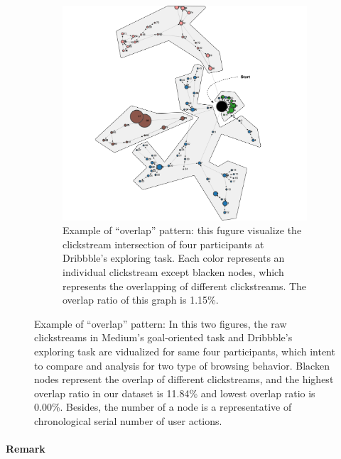 \begin{figure}[H]
    \begin{subfigure}[b]{0.60\textwidth}
        \includegraphics[width=1\textwidth]{figures/overlap2}
        \caption{Example of ``overlap'' pattern: this fugure visualize the clickstream intersection
        of four participants at Dribbble's exploring task. Each color represents an
        individual clickstream except blacken nodes, which represents the overlapping of different clickstreams.
        The overlap ratio of this graph is 1.15\%.}
        \label{fig:overlap-example-1}
    \end{subfigure}

    \caption{Example of ``overlap'' pattern: In this two figures, the raw clickstreams in
    Medium's goal-oriented task and Dribbble's exploring task are vidualized
    for same four participants, which intent to compare and analysis for two type of browsing behavior.
    Blacken nodes represent the overlap of different clickstreams, and the highest overlap ratio
    in our dataset is 11.84\% and lowest overlap ratio is 0.00\%. Besides, the number of a node
    is a representative of chronological serial number of user actions.
    }
    \label{fig:overlap-examples}
\end{figure}

\paragraph{Remark}

